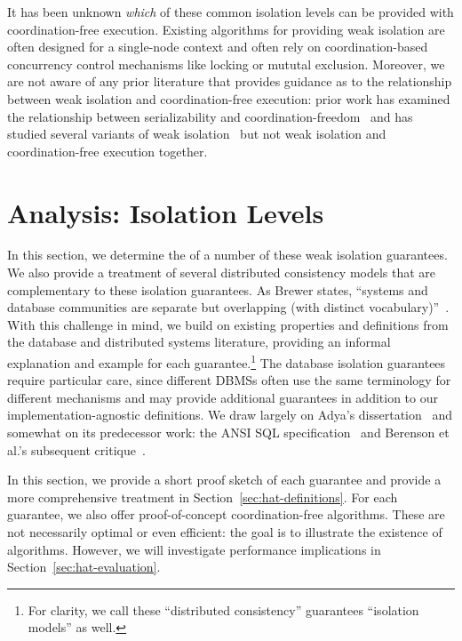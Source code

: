 It has been unknown \textit{which} of these common isolation levels
can be provided with coordination-free execution. Existing algorithms
for providing weak isolation are often designed for a single-node
context and often rely on coordination-based concurrency control
mechanisms like locking or mututal exclusion. Moreover, we are not
aware of any prior literature that provides guidance as to the
relationship between weak isolation and coordination-free execution:
prior work has examined the relationship between serializability and
coordination-freedom~\cite{davidson-survey} and has studied several
variants of weak isolation~\cite{adya, ansicritique, gray-isolation}
but not weak isolation and coordination-free execution together.

\section{\IConfluence Analysis: Isolation Levels}
\label{sec:ic-isolation}

In this section, we determine the \iconfluence of a number of these
weak isolation guarantees. We also provide a treatment of several
distributed consistency models that are complementary to these
isolation guarantees. As Brewer states, ``systems and database
communities are separate but overlapping (with distinct
vocabulary)''~\cite{brewer-slides}. With this challenge in mind, we
build on existing properties and definitions from the database and
distributed systems literature, providing an informal
explanation and example for each guarantee.\footnote{For clarity, we
  call these ``distributed consistency'' guarantees ``isolation
  models'' as well.}  The database isolation guarantees require
particular care, since different DBMSs often use the same terminology
for different mechanisms and may provide additional guarantees in
addition to our implementation-agnostic definitions.  We draw largely
on Adya's dissertation~\cite{adya} and somewhat on its predecessor
work: the ANSI SQL specification~\cite{ansi-sql} and Berenson et al.'s
subsequent critique~\cite{ansicritique}.

In this section, we provide a short proof sketch of each guarantee and
provide a more comprehensive treatment in
Section~\ref{sec:hat-definitions}. For each \iconfluent guarantee, we
also offer proof-of-concept coordination-free algorithms. These are
not necessarily optimal or even efficient: the goal is to illustrate
the existence of algorithms. However, we will investigate performance
implications in Section~\ref{sec:hat-evaluation}.

